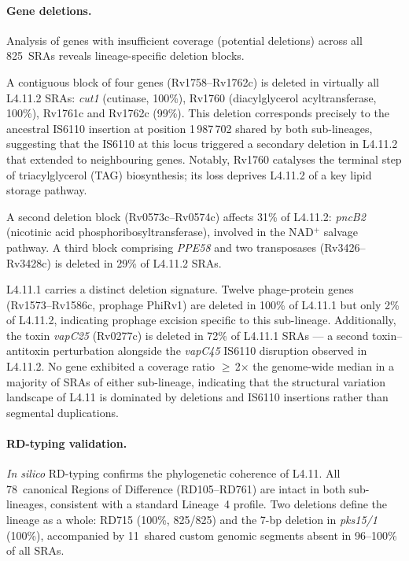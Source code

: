 \documentclass[11pt,a4paper]{article}
\newcommand{\lignee}[1]{\textsf{#1}}
\begin{document}
\paragraph{Gene deletions.}

Analysis of genes with insufficient coverage (potential deletions) across
all 825~SRAs reveals lineage-specific deletion
blocks.

A contiguous block of four genes (Rv1758--Rv1762c) is deleted in
virtually all \lignee{L4.11.2} SRAs: \textit{cut1} (cutinase, 100\%),
Rv1760 (diacylglycerol acyltransferase, 100\%), Rv1761c and Rv1762c
(99\%).  This deletion corresponds precisely to the ancestral IS6110
insertion at position 1\,987\,702 shared by both sub-lineages, suggesting
that the IS6110 at this locus triggered a secondary deletion in
\lignee{L4.11.2} that extended to neighbouring genes.  Notably, Rv1760
catalyses the terminal step of triacylglycerol (TAG) biosynthesis;
its loss deprives \lignee{L4.11.2} of a key lipid storage pathway.

A second deletion block (Rv0573c--Rv0574c) affects 31\% of
\lignee{L4.11.2}: \textit{pncB2} (nicotinic acid
phosphoribosyltransferase), involved in the NAD$^+$ salvage pathway.
A third block comprising \textit{PPE58} and two transposases
(Rv3426--Rv3428c) is deleted in 29\% of \lignee{L4.11.2} SRAs.

\lignee{L4.11.1} carries a distinct deletion signature.
Twelve phage-protein genes (Rv1573--Rv1586c, prophage PhiRv1) are
deleted in 100\% of \lignee{L4.11.1} but only 2\% of \lignee{L4.11.2},
indicating prophage excision specific to this sub-lineage.  Additionally,
the toxin \textit{vapC25} (Rv0277c) is deleted in 72\% of
\lignee{L4.11.1} SRAs --- a second toxin--antitoxin perturbation
alongside the \textit{vapC45} IS6110 disruption observed in
\lignee{L4.11.2}.
No gene exhibited a coverage ratio $\geq$\,2$\times$ the genome-wide
median in a majority of SRAs of either sub-lineage, indicating
that the structural variation landscape of \lignee{L4.11} is dominated
by deletions and IS6110 insertions rather than segmental duplications.

\paragraph{RD-typing validation.}

\textit{In silico} RD-typing confirms the phylogenetic coherence of
\lignee{L4.11}.  All 78~canonical Regions of Difference (RD105--RD761)
are intact in both sub-lineages, consistent with a standard Lineage~4
profile.  Two deletions define the lineage as a whole: RD715
(100\%, 825/825) and the 7-bp deletion in \textit{pks15/1} (100\%),
accompanied by 11~shared custom genomic segments absent in 96--100\% of
all SRAs.
\end{document}
